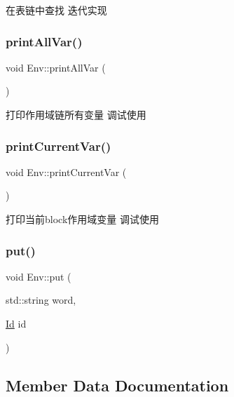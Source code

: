 在表链中查找 迭代实现 \mbox{\label{class_env_a8ba6704ef2039c2329569efc99f1e087}} 
\subsubsection{\texorpdfstring{print\+All\+Var()}{printAllVar()}}
{\footnotesize\ttfamily void Env\+::print\+All\+Var (\begin{DoxyParamCaption}{ }\end{DoxyParamCaption})}

打印作用域链所有变量 调试使用 \mbox{\label{class_env_a398c166330482abb7e38c546bc3974cf}} 
\subsubsection{\texorpdfstring{print\+Current\+Var()}{printCurrentVar()}}
{\footnotesize\ttfamily void Env\+::print\+Current\+Var (\begin{DoxyParamCaption}{ }\end{DoxyParamCaption})}

打印当前block作用域变量 调试使用 \mbox{\label{class_env_a4648c2b83fea7e757ccb4ab519ffc9a0}} 
\subsubsection{\texorpdfstring{put()}{put()}}
{\footnotesize\ttfamily void Env\+::put (\begin{DoxyParamCaption}\item[{std\+::string}]{word,  }\item[{\hyperlink{class_id}{Id}}]{id }\end{DoxyParamCaption})}



\subsection{Member Data Documentation}
\mbox{\label{class_env_a79a41e9166e949e4c1320ffe3750cb29}} 
